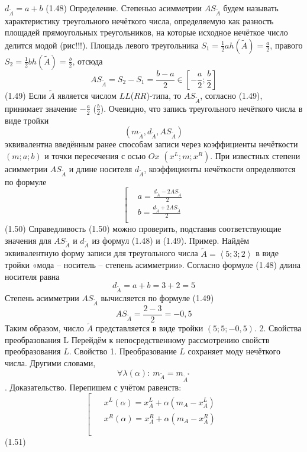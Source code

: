 	${{d}_{{\tilde{A}}}}=a+b$ 	(1.48)
Определение. Степенью асимметрии $A{{S}_{{\tilde{A}}}}$ будем называть характеристику треугольного нечёткого числа, определяемую как разность площадей прямоугольных треугольников, на которые исходное нечёткое число делится модой (рис!!!).
Площадь левого треугольника ${{S}_{1}}=\frac{1}{2}ah(\tilde{A})=\frac{a}{2}$, правого ${{S}_{2}}=\frac{1}{2}bh\left( {\tilde{A}} \right)=\frac{b}{2}$, отсюда
	\[A{{S}_{{\tilde{A}}}}={{S}_{2}}-{{S}_{1}}=\frac{b-a}{2}\in \left[ -\frac{a}{2};\frac{b}{2} \right]\] 	(1.49)
Если $\tilde{A}$ является числом $LL$($RR$)-типа, то $A{{S}_{{\tilde{A}}}}$, согласно (1.49), принимает значение $-\frac{a}{2}$ ($\frac{b}{2}$).
Очевидно, что запись треугольного нечёткого числа в виде тройки \[\left( {{m}_{{\tilde{A}}}},{{d}_{{\tilde{A}}}},A{{S}_{{\tilde{A}}}} \right)\] эквивалентна введённым ранее способам записи через коэффициенты нечёткости $\left( m;a;b \right)$ и точки пересечения с осью $Ox$ $\left( {{x}^{L}};m;{{x}^{R}} \right)$. При известных степени асимметрии $A{{S}_{{\tilde{A}}}}$ и длине носителя ${{d}_{{\tilde{A}}}}$, коэффициенты нечёткости определяются по формуле
	\[\left[ \begin{aligned}
  & a=\frac{{{d}_{{\tilde{A}}}}-2A{{S}_{{\tilde{A}}}}}{2} \\ 
 & b=\frac{{{d}_{{\tilde{A}}}}+2A{{S}_{{\tilde{A}}}}}{2} \\ 
\end{aligned} \right.\] 	(1.50)
Справедливость (1.50) можно проверить, подставив соответствующие значения для $A{{S}_{{\tilde{A}}}}$ и ${{d}_{{\tilde{A}}}}$ из формул (1.48) и (1.49).
Пример. Найдём эквивалентную форму записи для треугольного числа $\tilde{A}=\left\langle 5;3;2 \right\rangle $ в виде тройки «мода – носитель – степень асимметрии».
Согласно формуле (1.48) длина носителя равна
	\[{{d}_{{\tilde{A}}}}=a+b=3+2=5\]
Степень асимметрии $A{{S}_{{\tilde{A}}}}$ вычисляется по формуле (1.49)
	\[A{{S}_{{\tilde{A}}}}=\frac{2-3}{2}=-0,5\] 
Таким образом, число $\tilde{A}$ представляется в виде тройки $\left( 5;5;-0,5 \right)$.
2. Свойства преобразования L
Перейдём к непосредственному рассмотрению свойств преобразования $L$.
Свойство 1. Преобразование $L$ сохраняет моду нечёткого числа. Другими словами, \[\forall \lambda (\alpha ):\ {{m}_{{\tilde{A}}}}={{m}_{{{{\tilde{A}}}^{*}}}}\].
Доказательство. Перепишем с учётом равенств:
	\[\left[ \begin{matrix}
   \begin{aligned}
  & {{x}^{L}}(\alpha )=x_{A}^{L}+\alpha ({{m}_{A}}-x_{A}^{L}) \\ 
 & {{x}^{R}}(\alpha )=x_{A}^{R}+\alpha ({{m}_{A}}-x_{A}^{R}) \\ 
\end{aligned}  \\
\end{matrix} \right.\] 	(1.51)
